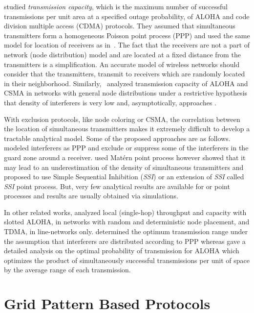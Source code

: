 \documentclass[12pt,english]{article}
\begin{document}
\cite{Weber,Weber2} studied {\em transmission capacity}, which is the maximum number of successful transmissions per unit area at a specified outage probability, of ALOHA and code division multiple access (CDMA) protocols. They assumed that simultaneous transmitters form a homogeneous Poisson point process (PPP) and used the same model for location of receivers as in~\cite{Bartek}. The fact that the receivers are not a part of network (node distribution) model and are located at a fixed distance from the transmitters is a simplification. An accurate model of wireless networks should consider that the transmitters, transmit to receivers which are randomly located in their neighborhood. Similarly,~\cite{Weber3} analyzed transmission capacity of ALOHA and CSMA in networks with general node distributions under a restrictive hypothesis that density of interferers is very low and, asymptotically, approaches . 

With exclusion protocols, like node coloring or CSMA, the correlation between the location of simultaneous transmitters makes it extremely difficult to develop a tractable analytical model. Some of the proposed approaches are as follows. \cite{Guard,Guard2} modeled interferers as PPP and exclude or suppress some of the interferers in the guard zone around a receiver. \cite{CSMA-Model,Weber3} used Mat\'ern point process however \cite{Busson} showed that it may lead to an underestimation of the density of simultaneous transmitters and proposed to use Simple Sequential Inhibition ({\em SSI}) or an extension of {\em SSI} called {\em SSI} point process. But, very few analytical results are available for  or  point processes and results are usually obtained via simulations.

In other related works, \cite{Haenggi} analyzed local (single-hop) throughput and capacity with slotted ALOHA, in networks with random and deterministic node placement, and TDMA, in  line-networks only. \cite{Zorzi2} determined the optimum transmission range under the assumption that interferers are distributed according to PPP whereas \cite{SR-ALOHA} gave a detailed analysis on the optimal probability of transmission for ALOHA which optimizes the product of simultaneously successful transmissions per unit of space by the average range of each transmission. 

 
\section{Grid Pattern Based Protocols}
\label{sec:grid_pattern}
\end{document}
